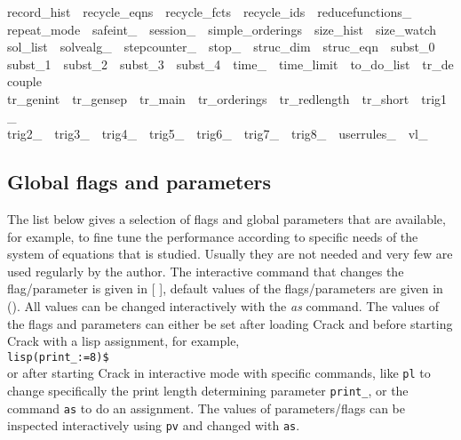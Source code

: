 \documentclass[12pt]{article}
\begin{document}
{record\_hist\ \ recycle\_eqns\ \ recycle\_fcts\ \ recycle\_ids\ \ reducefunctions\_\ \ \\
repeat\_mode\ \ safeint\_\ \ session\_\ \ simple\_orderings\ \ size\_hist\ \ size\_watch\ \ \\
sol\_list\ \ solvealg\_\ \ stepcounter\_\ \ stop\_\ \ struc\_dim\ \ struc\_eqn\ \ subst\_0\ \ \\
subst\_1\ \ subst\_2\ \ subst\_3\ \ subst\_4\ \ time\_\ \ time\_limit\ \ to\_do\_list\ \ tr\_decouple\ \ \\
tr\_genint\ \ tr\_gensep\ \ tr\_main\ \ tr\_orderings\ \ tr\_redlength\ \ tr\_short\ \ trig1\_\ \ \\
trig2\_\ \ trig3\_\ \ trig4\_\ \ trig5\_\ \ trig6\_\ \ trig7\_\ \ trig8\_\ \ userrules\_\ \ vl\_}

\subsection{Global flags and parameters}
The list below gives a selection of
flags and global parameters that are available, for example,
to fine tune the performance according to specific needs of the system
of equations that is studied. Usually they are not needed and very few
are used regularly by the author. The interactive command that changes the
flag/parameter is given in [ ], default values of the flags/parameters
are given in (). All values can be changed interactively with the {\em as} command.
The values of the flags and parameters can either be
set after loading {\sc Crack} and before starting {\sc Crack} with a
lisp assignment, for example,\\
\verb+lisp(print_:=8)$+ \\ %
or after starting {\sc Crack} in interactive mode with specific commands, 
like {\tt pl} to change specifically the print length determining parameter
{\tt print\_}, or the command {\tt as} to do an assignment. 
The values of
parameters/flags can be inspected interactively using {\tt pv}
and changed with {\tt as}.
\end{document}
